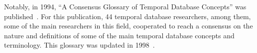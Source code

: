 Notably, in 1994, ``A Consensus Glossary of Temporal Database Concepts'' was published~\cite{Dyreson1994}. For this publication, 44 temporal database researchers, among them, some of the main researchers in this field, cooperated to reach a consensus on the nature and definitions of some of the main temporal database concepts and terminology. This glossary was updated in 1998~\cite{Dyreson1998}.




